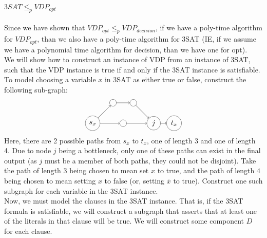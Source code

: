 \documentclass[letterpaper,notitlepage,twoside]{article}
\begin{document}
$3SAT \leq _{p} VDP_{opt}$\\\\
Since we have shown that $VDP_{opt} \leq _{p} VDP_{decision}$, if we have a poly-time algorithm for $VDP_{opt}$, than we also have a poly-time algorithm for 3SAT (IE, if we assume we have a polynomial time algorithm for decision, than we have one for opt). \\
We will show how to construct an instance of VDP from an instance of 3SAT, such that the VDP instance is true if and only if the 3SAT instance is satisfiable. To model choosing a variable $x$ in 3SAT as either true or false, construct the following sub-graph: \\
$$\begin{tikzpicture}
    \node[circle,draw=black!80] (a) at (0, 1) {$s_x$};
    \node[circle,draw=black!80] (b) at (1, 2) {};
    \node[circle,draw=black!80] (c) at (2, 2) {};
    \node[circle,draw=black!80] (d) at (1.5, 1) {};
    \node[circle,draw=black!80] (e) at (3, 1) {$j$};
    \node[circle,draw=black!80] (f) at (4, 1) {$t_x$};
    \path[->] (a) edge node {} (b);
    \path[->] (b) edge node {} (c);
    \path[->] (c) edge node {} (e);
    \path[->] (e) edge node {} (f);
    \path[->] (a) edge node {} (d);
    \path[->] (d) edge node {} (e);
\end{tikzpicture}$$
Here, there are 2 possible paths from $s_x$ to $t_x$, one of length 3 and one of length 4. Due to node $j$ being a bottleneck, only one of these paths can exist in the final output (as $j$ must be a member of both paths, they could not be disjoint). Take the path of length 3 being chosen to mean set $x$ to true, and the path of length $4$ being chosen to mean setting $x$ to false (or, setting $\overline x$ to true). Construct one such subgraph for each variable in the 3SAT instance. \\
Now, we must model the clauses in the 3SAT instance. That is, if the 3SAT formula is satisfiable, we will construct a subgraph that asserts that at least one of the literals in that clause will be true. We will construct some component $D$ for each clause.
\end{document}
